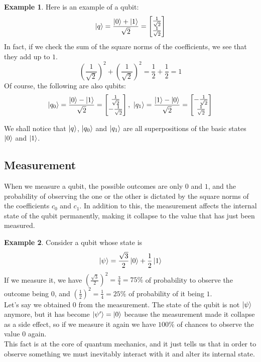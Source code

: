 \documentclass[12pt,a4paper]{report}
\theoremstyle{definition}
\theoremstyle{definition}
\newtheorem{example}{Example}[section]
\theoremstyle{definition}
\begin{document}
\begin{example}
Here is an example of a qubit:
\begin{equation*}
    \ket{q}=\frac{\ket{0}+\ket{1}}{\sqrt{2}}=\begin{bmatrix}
        \frac{1}{\sqrt{2}}\\
        \frac{1}{\sqrt{2}}
    \end{bmatrix}
\end{equation*}
In fact, if we check the sum of the square norms of the coefficients, we see that they add up to $1$.
\begin{equation*}
    \left(\frac{1}{\sqrt{2}}\right)^2+\left(\frac{1}{\sqrt{2}}\right)^2=\frac{1}{2}+\frac{1}{2}=1
\end{equation*}
Of course, the following are also qubits:
\begin{equation*}
    \ket{q_0}=\frac{\ket{0}-\ket{1}}{\sqrt{2}}=\begin{bmatrix}
        \frac{1}{\sqrt{2}}\\
        -\frac{1}{\sqrt{2}}
    \end{bmatrix},\ 
    \ket{q_1}=\frac{\ket{1}-\ket{0}}{\sqrt{2}}=\begin{bmatrix}
        -\frac{1}{\sqrt{2}}\\
        \frac{1}{\sqrt{2}}
    \end{bmatrix}
\end{equation*}
\end{example}
We shall notice that $\ket{q}$, $\ket{q_0}$ and $\ket{q_1}$ are all superpositions of the basic states $\ket{0}$ and $\ket{1}$.




\subsection{Measurement}
When we measure a qubit, the possible outcomes are only $0$ and $1$, and the probability of observing the one or the other is dictated by the square norms of the coefficients $c_0$ and $c_1$. In addition to this, the measurement affects the internal state of the qubit permanently, making it collapse to the value that has just been measured.
\begin{example}
Consider a qubit whose state is
\begin{equation*}
    \ket{\psi}=\frac{\sqrt{3}}{2}\ket{0}+\frac{1}{2}\ket{1}
\end{equation*}
If we measure it, we have $\left(\frac{\sqrt{3}}{2}\right)^2=\frac{3}{4}=75\%$ of probability to observe the outcome being $0$, and $\left(\frac{1}{2}\right)^2=\frac{1}{4}=25\%$ of probability of it being $1$.\\
Let's say we obtained $0$ from the measurement. The state of the qubit is not $\ket{\psi}$ anymore, but it has become $\ket{\psi'}=\ket{0}$ because the measurement made it collapse as a side effect, so if we measure it again we have $100\%$ of chances to observe the value $0$ again.\\
This fact is at the core of quantum mechanics, and it just tells us that in order to observe something we must inevitably interact with it and alter its internal state.
\end{example}
\end{document}
